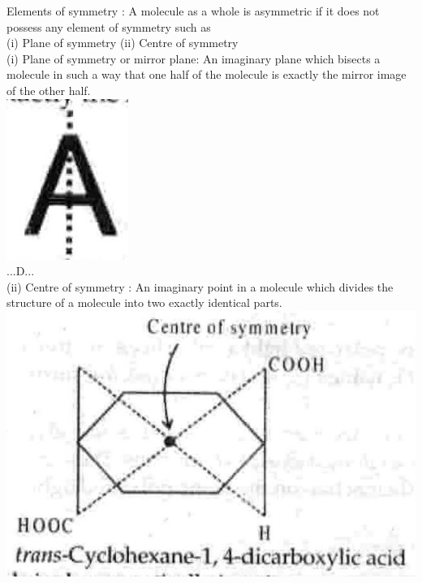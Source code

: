 \documentclass[10pt]{article}
\begin{document}
Elements of symmetry : A molecule as a whole is asymmetric if it does not possess any element of symmetry such as\\
(i) Plane of symmetry (ii) Centre of symmetry\\
(i) Plane of symmetry or mirror plane: An imaginary plane which bisects a molecule in such a way that one half of the molecule is exactly the mirror image of the other half.\\
\includegraphics[max width=\textwidth, center]{2025_01_28_8470952b98110cec3aabg-050}\\
...D...\\
(ii) Centre of symmetry : An imaginary point in a molecule which divides the structure of a molecule into two exactly identical parts.\\
\includegraphics[max width=\textwidth, center]{2025_01_28_8470952b98110cec3aabg-050(1)}
\end{document}
